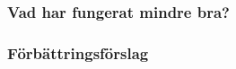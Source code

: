 \documentclass[a4paper]{article}
\begin{document}
\subsubsection{Vad har fungerat mindre bra?}




\subsubsection{Förbättringsförslag}



\end{document}
